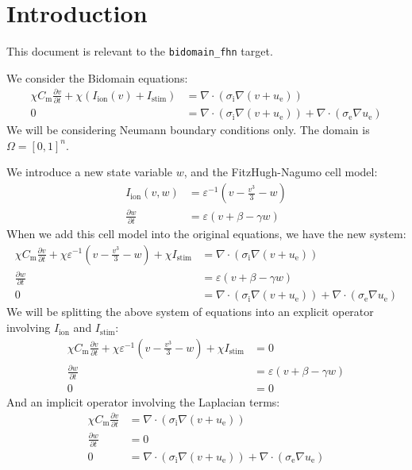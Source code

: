 \documentclass{article}
\begin{document}
\section{Introduction}

This document is relevant to the \texttt{bidomain\_fhn} target.

We consider the Bidomain equations:
\begin{align*}
    \chi C_\text{m} \frac{\partial v}{\partial t}
            + \chi (I_\text{ion}(v) + I_\text{stim})
        & = \nabla \cdot (\sigma_\text{i} \nabla (v + u_\text{e})) \\
    0
        & = \nabla \cdot (\sigma_\text{i} \nabla (v + u_\text{e}))
            + \nabla \cdot (\sigma_\text{e} \nabla u_\text{e})
\end{align*}
\noindent We will be considering Neumann boundary conditions only.
The domain is $\Omega = [0, 1]^n$.

We introduce a new state variable $w$,
and the FitzHugh-Nagumo cell model:
\begin{align*}
    I_\text{ion}(v, w)
        & = \varepsilon^{-1} (v - \frac{v^3}{3} - w) \\
    \frac{\partial w}{\partial t}
        & = \varepsilon (v + \beta - \gamma w)
\end{align*}
\noindent When we add this cell model into the original equations,
we have the new system:
\begin{align*}
    \chi C_\text{m} \frac{\partial v}{\partial t}
            + \chi \varepsilon^{-1} (v - \frac{v^3}{3} - w)
            + \chi I_\text{stim}
        & = \nabla \cdot (\sigma_\text{i} \nabla (v + u_\text{e})) \\
    \frac{\partial w}{\partial t}
        & = \varepsilon (v + \beta - \gamma w) \\
    0
        & = \nabla \cdot (\sigma_\text{i} \nabla (v + u_\text{e}))
            + \nabla \cdot (\sigma_\text{e} \nabla u_\text{e})
\end{align*}
\noindent We will be splitting the above system of equations into an explicit operator
involving $I_\text{ion}$ and $I_\text{stim}$:
\begin{align*}
    \chi C_\text{m} \frac{\partial v}{\partial t}
            + \chi \varepsilon^{-1} (v - \frac{v^3}{3} - w)
            + \chi I_\text{stim}
        & = 0 \\
    \frac{\partial w}{\partial t}
        & = \varepsilon (v + \beta - \gamma w) \\
    0 & = 0
\end{align*}
\noindent And an implicit operator involving the Laplacian terms:
\begin{align*}
    \chi C_\text{m} \frac{\partial v}{\partial t}
        & = \nabla \cdot (\sigma_\text{i} \nabla (v + u_\text{e})) \\
    \frac{\partial w}{\partial t} & = 0 \\
    0
        & = \nabla \cdot (\sigma_\text{i} \nabla (v + u_\text{e}))
            + \nabla \cdot (\sigma_\text{e} \nabla u_\text{e})
\end{align*}
\end{document}
